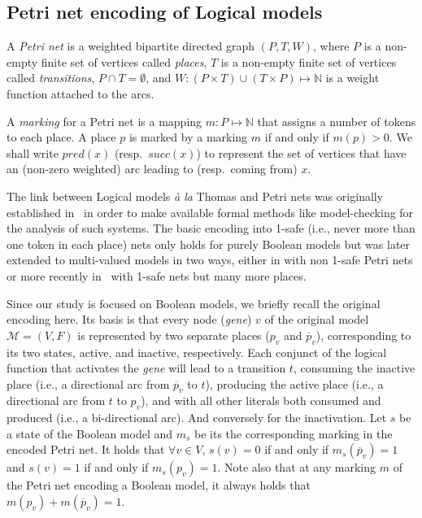 \documentclass[runningheads]{llncs}
\newcommand{\vangiang}[1]{\textcolor{magenta}{#1}}
\begin{document}

\subsection{Petri net encoding of Logical models}
\label{sec:encoding}

\begin{definition}

  A \emph{Petri net} is a weighted bipartite directed graph \((P, T, W)\),
  where \(P\) is a non-empty finite set of vertices called \emph{places},
  \(T\) is a non-empty finite set of vertices called \emph{transitions},
  \(P \cap T = \emptyset\),
  and \(W : (P \times T) \cup (T \times P) \mapsto \mathbb{N} \) is a weight function attached to the arcs.

\end{definition}
A \emph{marking} for a Petri net is a mapping \(m : P \mapsto \mathbb{N}\) that assigns a number of tokens to each place. A place \(p\) is marked by a marking \(m\) if and only if \(m(p) > 0\). We shall write \(pred(x)\) (resp.\ \(succ(x)\)) to represent the set of vertices that have an (non-zero weighted) arc leading to (resp.\ coming from) \(x\).

The link between Logical models \emph{à la} Thomas and Petri nets was originally established in~\cite{chaouiya2004qualitative} in order to make available formal methods like model-checking for the analysis of such systems.
The basic encoding into 1-safe (i.e., never more than one token in each place) nets only holds for purely Boolean models but was later extended to multi-valued models in two ways, either in \cite{chaouiya2011petri} with non 1-safe Petri nets or more recently in~\cite{chatain2014characterization} with 1-safe nets but many more places.

Since our study is focused on Boolean models, we briefly recall the original encoding here.
Its basis is that every node (\emph{gene}) \(v\) of the original model \(\mathcal{M} = (V, F)\) is represented by two separate places (\(p_v\) and \(\overline{p}_v\)), corresponding to its two states, active, and inactive, respectively.
Each conjunct of the logical function that activates the \emph{gene} will lead to a transition \(t\), consuming the inactive place (i.e., a directional arc from \(\overline{p}_v\) to \(t\)), producing the active place (i.e., a directional arc from \(t\) to \(p_v\)), and with all other literals both consumed and produced (i.e., a bi-directional arc).
And conversely for the inactivation. 
Let \(s\) be a state of the Boolean model and \(m_s\) be its the corresponding marking in the encoded Petri net. It holds that \(\forall v \in V\), \(s(v) = 0\) if and only if \(m_s(\overline{p}_v) = 1\) and \(s(v) = 1\) if and only if \(m_s(p_v) = 1\). Note also that at any marking \(m\) of the Petri net encoding a Boolean model, it always holds that \(m(p_v) + m(\overline{p}_v) = 1\).
\end{document}
